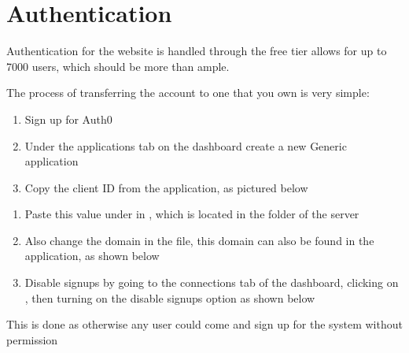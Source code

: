 \documentclass[letterpaper,10pt,english]{sphinxmanual}
\let\sphinxpxdimen\pdfpxdimen\else\newdimen\sphinxpxdimen
\begin{document}
\section{Authentication}
\label{\detokenize{docs/Installation/authentication:authentication}}\label{\detokenize{docs/Installation/authentication::doc}}
Authentication for the website is handled through
 the free tier allows for up to 7000
users, which should be more than ample.

The process of transferring the account to one that you own is very
simple:
\begin{enumerate}
%
\item {} 
Sign up for Auth0 

\item {} 
Under the applications tab on the dashboard create a new Generic
application

\item {} 
Copy the client ID from the application, as pictured below

\end{enumerate}

\noindent{\hspace*{\fill}\sphinxincludegraphics[width=500\sphinxpxdimen]{{auth0}.png}\hspace*{\fill}}
\begin{enumerate}
%
\setcounter{enumi}{3}
\item {} 
Paste this value under  in , which is
located in the  folder of the  server

\item {} 
Also change the domain in the  file, this domain
can also be found in the application, as shown below

\item {} 
Disable signups by going to the connections tab of the dashboard,
clicking on , then turning on the
disable signups option as shown below

\end{enumerate}

This is done as otherwise any user could come and sign up for the system
without permission
\end{document}
